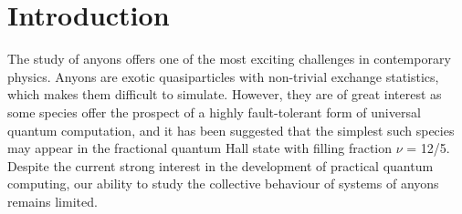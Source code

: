 \documentclass[aps,prb,reprint,superscriptaddress,amsfonts,amsmath,amssymb,showpacs,floatfix]{revtex4-1}
\newcommand{\prbtext}[1]{#1}
\newcommand{\pratext}[1]{}
\newcommand{\citecomma}[1]{,\cite{#1}}
\begin{document}


\maketitle


\section{Introduction}

The study of anyons offers one of the most exciting challenges in contemporary physics. Anyons are exotic quasiparticles with non-trivial exchange statistics, which makes them difficult to simulate. However, they are of great interest as some species offer the prospect of a highly fault-tolerant form of universal quantum computation\citecomma{kitaev2003,nayak2008} and it has been suggested\prbtext{\cite{xia2004}} that the simplest such species may appear in the fractional quantum Hall state with filling fraction $\nu$ = 12/5\pratext{ \cite{xia2004}}. Despite the current strong interest in the development of practical quantum computing, our ability to study the collective behaviour of systems of anyons remains limited.
\end{document}
